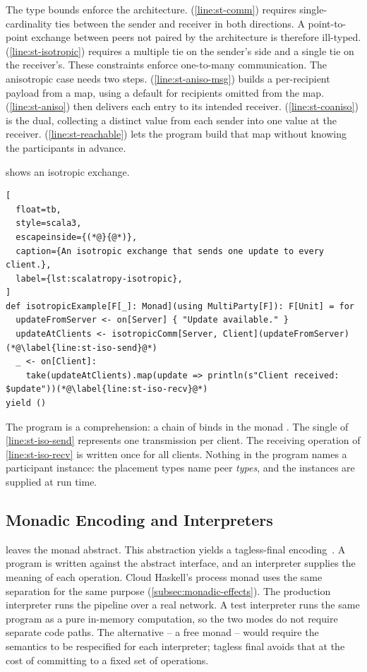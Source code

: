 The type bounds enforce the architecture.
%
 (\cref{line:st-comm}) requires single-cardinality ties between the sender and receiver in both directions.
A point-to-point exchange between peers not paired by the architecture is therefore ill-typed.
%
 (\cref{line:st-isotropic}) requires a multiple tie on the sender's side and a single tie on the receiver's.
These constraints enforce one-to-many communication.
%
The anisotropic case needs two steps.
 (\cref{line:st-aniso-msg}) builds a per-recipient payload from a map,
using a default for recipients omitted from the map.
 (\cref{line:st-aniso}) then delivers each entry to its intended receiver.
%
 (\cref{line:st-coaniso}) is the dual, collecting a distinct value from each sender into one  value at the receiver.
%
 (\cref{line:st-reachable}) lets the program build that map without knowing the participants in advance.

 shows an isotropic exchange.

\begin{lstlisting}[
  float=tb,
  style=scala3,
  escapeinside={(*@}{@*)},
  caption={An isotropic exchange that sends one update to every client.},
  label={lst:scalatropy-isotropic},
]
def isotropicExample[F[_]: Monad](using MultiParty[F]): F[Unit] = for
  updateFromServer <- on[Server] { "Update available." }
  updateAtClients <- isotropicComm[Server, Client](updateFromServer)(*@\label{line:st-iso-send}@*)
  _ <- on[Client]:
    take(updateAtClients).map(update => println(s"Client received: $update"))(*@\label{line:st-iso-recv}@*)
yield ()
\end{lstlisting}

The program is a  comprehension: a chain of binds in the monad .
%
The single  of \cref{line:st-iso-send} represents one transmission per client.
The receiving operation of \cref{line:st-iso-recv} is written once for all clients.
%
Nothing in the program names a participant instance:
the placement types name peer \emph{types}, and the instances are supplied at run time.

\subsection{Monadic Encoding and Interpreters}
\label{subsec:scalatropy-monad}

 leaves the monad  abstract.
This abstraction yields a tagless-final encoding~\cite{DBLP:journals/jfp/CaretteKS09}.
%
A program is written against the abstract interface, and an interpreter supplies the meaning of each operation.
%
Cloud Haskell's process monad uses the same separation for the same purpose (\cref{subsec:monadic-effects}).
The production interpreter runs the pipeline over a real network.
A test interpreter runs the same program as a pure in-memory computation,
so the two modes do not require separate code paths.
%
The alternative -- a free monad -- would require the semantics to be respecified for each interpreter;
tagless final avoids that at the cost of committing to a fixed set of operations.

